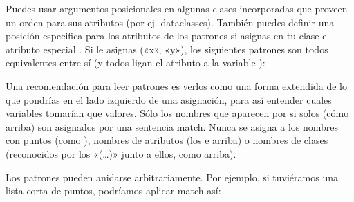 \documentclass[a4,10pt,spanish]{sphinxmanual}
\begin{document}
\sphinxAtStartPar
Puedes usar argumentos posicionales en algunas clases incorporadas que proveen un orden para sus atributos (por ej. dataclasses). También puedes definir una posición especifica para los atributos de los patrones si asignas en tu clase el atributo especial . Si le asignas («x», «y»), los siguientes patrones son todos equivalentes entre sí (y todos ligan el atributo  a la variable ):

\begin{sphinxVerbatim}[commandchars=\\\{\}]
 
 
 
 
\end{sphinxVerbatim}

\sphinxAtStartPar
Una recomendación para leer patrones es verlos como una forma extendida de lo que pondrías en el lado izquierdo de una asignación, para así entender cuales variables tomarían que valores. Sólo los nombres que aparecen por si solos (cómo  arriba) son asignados por una sentencia match. Nunca se asigna a los nombres con puntos (como ), nombres de atributos (los  e  arriba) o nombres de clases (reconocidos por los «(…)» junto a ellos, como  arriba).

\sphinxAtStartPar
Los patrones pueden anidarse arbitrariamente. Por ejemplo, si tuviéramos una lista corta de puntos, podríamos aplicar match así:
\end{document}
